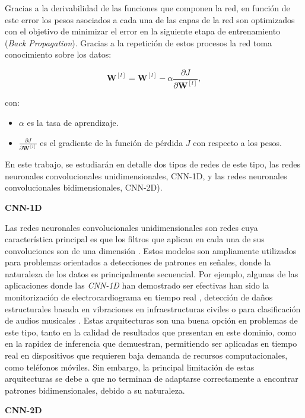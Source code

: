 \documentclass{uathesis-es}
\begin{document}
	
	Gracias a la derivabilidad de las funciones que componen la red, en función de este error los pesos asociados a cada una de las capas de la red son optimizados con el objetivo de minimizar el error en la siguiente etapa de entrenamiento (\textit{Back Propagation}). Gracias a la repetición de estos procesos la red toma conocimiento sobre los datos:
	
	\[
	\mathbf{W}^{[l]} = \mathbf{W}^{[l]} - \alpha \frac{\partial J}{\partial \mathbf{W}^{[l]}},
	\]
	
	con:
	\begin{itemize}
		\item \(\alpha\) es la tasa de aprendizaje.
		\item \(\frac{\partial J}{\partial \mathbf{W}^{[l]}}\) es el gradiente de la función de pérdida \(J\) con respecto a los pesos.
	\end{itemize}
	
	En este trabajo, se estudiarán en detalle dos tipos de redes de este tipo, las redes neuronales convolucionales unidimensionales, CNN-1D, y las redes neuronales convolucionales bidimensionales, CNN-2D).
	
	\textbf{CNN-1D}
	
	Las redes neuronales convolucionales unidimensionales son redes cuya característica principal es que los filtros que aplican en cada una de sus convoluciones son de una dimensión \cite{CNN1D}. Estos modelos son ampliamente utilizados para problemas orientados a detecciones de patrones en señales, donde la naturaleza de los datos es principalmente secuencial. Por ejemplo, algunas de las aplicaciones donde las \textit{CNN-1D} han demostrado ser efectivas han sido la monitorización de electrocardiograma en tiempo real \cite{Kiranyaz2017tt}, detección de daños estructurales basada en vibraciones en infraestructuras civiles \cite{khodabandehlou2019vibration} o para clasificación de audios musicales \cite{allamy20211d}. Estas arquitecturas son una buena opción en problemas de este tipo, tanto en la calidad de resultados que presentan en este dominio, como en la rapidez de inferencia que demuestran, permitiendo ser aplicadas en tiempo real en dispositivos que requieren baja demanda de recursos computacionales, como teléfonos móviles. Sin embargo, la principal limitación de estas arquitecturas se debe a que no terminan de adaptarse correctamente a encontrar patrones bidimensionales, debido a su naturaleza.
	
	\textbf{CNN-2D}
	
\end{document}
